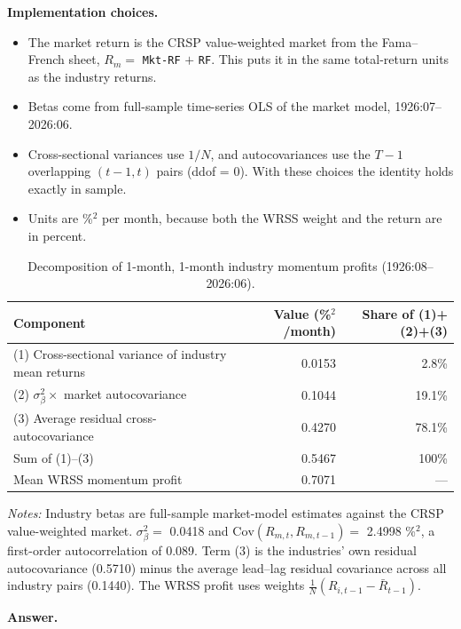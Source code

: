 \documentclass[11pt]{article}
\begin{document}
\textbf{Implementation choices.}
 
\begin{itemize}
  \item The market return is the CRSP value-weighted market from the Fama--French sheet, $R_m=$ \texttt{Mkt-RF} $+$ \texttt{RF}. This puts it in the same total-return units as the industry returns.
  \item Betas come from full-sample time-series OLS of the market model, 1926:07--2026:06.
  \item Cross-sectional variances use $1/N$, and autocovariances use the $T-1$ overlapping $(t-1,t)$ pairs (ddof = 0). With these choices the identity holds exactly in sample.
  \item Units are \%$^2$ per month, because both the WRSS weight and the return are in percent.
\end{itemize}
 
\begin{table}[H]
\centering
\caption{Decomposition of 1-month, 1-month industry momentum profits (1926:08--2026:06).}
\label{tab:decomp}
\begin{tabularx}{\textwidth}{Xrr}
\toprule
Component & Value (\%$^2$/month) & Share of (1)+(2)+(3) \\
\midrule
(1) Cross-sectional variance of industry mean returns & 0.0153 & 2.8\% \\
(2) $\sigma^2_\beta \times$ market autocovariance & 0.1044 & 19.1\% \\
(3) Average residual cross-autocovariance & 0.4270 & 78.1\% \\
\midrule
Sum of (1)--(3) & 0.5467 & 100\% \\
Mean WRSS momentum profit & 0.7071 & --- \\
\bottomrule
\end{tabularx}
\end{table}
 
\emph{Notes:} Industry betas are full-sample market-model estimates against the CRSP value-weighted market. $\sigma^2_\beta=$ 0.0418 and $\mathrm{Cov}(R_{m,t},R_{m,t-1})=$ 2.4998 \%$^2$, a first-order autocorrelation of 0.089. Term (3) is the industries' own residual autocovariance (0.5710) minus the average lead--lag residual covariance across all industry pairs (0.1440). The WRSS profit uses weights $\frac{1}{N}(R_{i,t-1}-\bar R_{t-1})$.
 
\textbf{Answer.}
 
\end{document}

